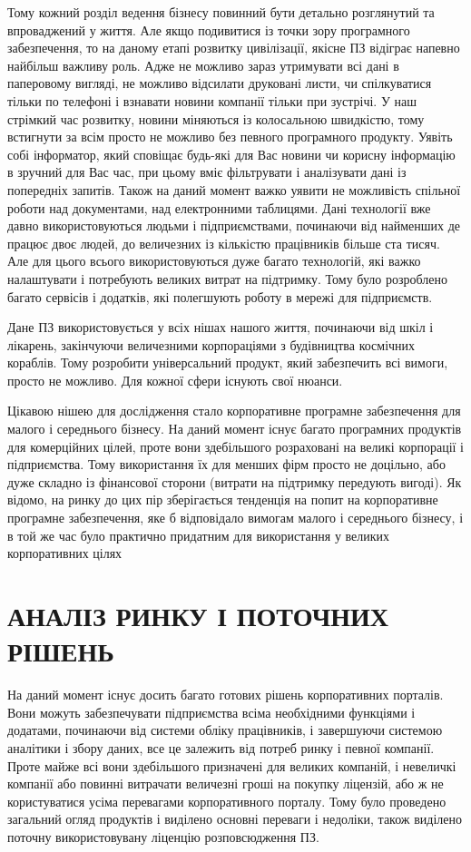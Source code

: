Тому кожний розділ ведення бізнесу повинний бути детально розглянутий та впроваджений у життя. 
Але якщо подивитися із точки зору програмного забезпечення, то на даному етапі розвитку цивілізації, якісне ПЗ відіграє напевно найбільш важливу роль. 
Адже не можливо зараз утримувати всі дані в паперовому вигляді, не можливо відсилати друковані листи, чи спілкуватися тільки по телефоні і взнавати новини компанії тільки при зустрічі. 
У наш стрімкий час розвитку, новини міняються із колосальною швидкістю, тому встигнути за всім просто не можливо без певного програмного продукту. 
Уявіть собі інформатор, який сповіщає будь-які для Вас новини чи корисну інформацію в зручний для Вас час, при цьому вміє фільтрувати і аналізувати дані із попередніх запитів. 
Також на даний момент важко уявити не можливість спільної роботи над документами, над електронними таблицями. 
Дані технології вже давно використовуються людьми і підприємствами, починаючи від найменших де працює двоє людей, до величезних із кількістю працівників більше ста тисяч. 
Але для цього всього використовуються дуже багато технологій, які важко налаштувати і потребують великих витрат на підтримку.
Тому було розроблено багато сервісів і додатків, які полегшують роботу в мережі для підприємств.
\par Дане ПЗ використовується у всіх нішах нашого життя, починаючи від шкіл і лікарень, закінчуючи величезними корпораціями з будівництва космічних кораблів. 
Тому розробити універсальний продукт, який забезпечить всі вимоги, просто не можливо. 
Для кожної сфери існують свої нюанси.
\par Цікавою нішею для дослідження стало корпоративне програмне забезпечення для малого і середнього бізнесу.
 На даний момент існує багато програмних продуктів для комерційних цілей, проте вони здебільшого розраховані на великі корпорації і підприємства.
Тому використання їх для менших фірм просто не доцільно, або дуже складно із фінансової сторони (витрати на підтримку передують вигоді).
Як відомо, на ринку до цих пір зберігається тенденція на попит на корпоративне програмне забезпечення, яке б відповідало вимогам малого і середнього бізнесу, і в той же час було практично придатним для використання у великих корпоративних цілях


\section{АНАЛІЗ РИНКУ І ПОТОЧНИХ РІШЕНЬ}
На даний момент існує досить багато готових рішень корпоративних порталів. 
Вони можуть забезпечувати підприємства всіма необхідними функціями і додатами, починаючи від системи обліку працівників, і завершуючи системою аналітики і збору даних, все це залежить від потреб ринку і певної компанії.
Проте майже всі вони здебільшого призначені для великих компаній, і невеличкі компанії або повинні витрачати величезні гроші на покупку ліцензій, або ж не користуватися усіма перевагами корпоративного порталу.
Тому було проведено загальний огляд продуктів і виділено основні переваги і недоліки, також виділено поточну використовувану ліценцію розповсюдження ПЗ.
